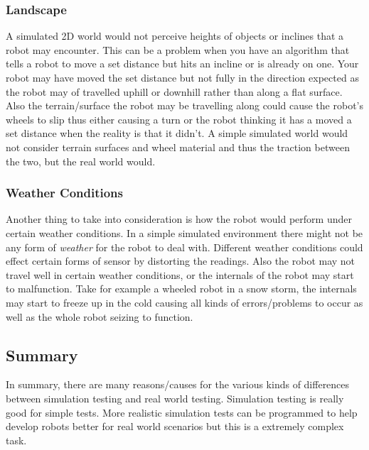 \documentclass[a4paper,12pt]{article}
\begin{document}
\subsubsection{Landscape}

\noindent A simulated 2D world would not perceive heights of objects or inclines that a robot may encounter. This can be a problem when you have an algorithm that tells a robot to move a set distance but hits an incline or is already on one. Your robot may have moved the set distance but not fully in the direction expected as the robot may of travelled uphill or downhill rather than along a flat surface. Also the terrain/surface the robot may be travelling along could cause the robot's wheels to slip thus either causing a turn or the robot thinking it has a moved a set distance when the reality is that it didn't. A simple simulated world would not consider terrain surfaces and wheel material and thus the traction between the two, but the real world would.

\subsubsection{Weather Conditions}

\noindent Another thing to take into consideration is how the robot would perform under certain weather conditions. In a simple simulated environment there might not be any form of \textit{weather} for the robot to deal with. Different weather conditions could effect certain forms of sensor by distorting the readings. Also the robot may not travel well in certain weather conditions, or the internals of the robot may start to malfunction. Take for example a wheeled robot in a snow storm, the internals may start to freeze up in the cold causing all kinds of errors/problems to occur as well as the whole robot seizing to function.

\subsection{Summary}

In summary, there are many reasons/causes for the various kinds of differences between simulation testing and real world testing. Simulation testing is really good for simple tests. More realistic simulation tests can be programmed to help develop robots better for real world scenarios but this is a extremely complex task.

\vspace{5mm}
\noindent 
\end{document}
